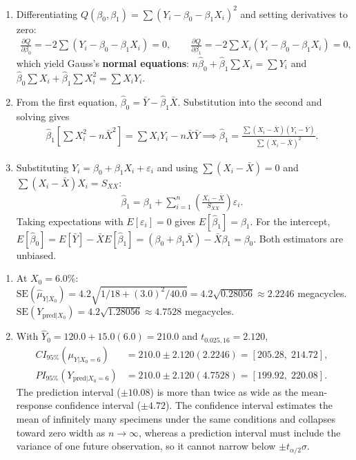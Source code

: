 \begin{solproblema}[prob:e97453b]
\begin{enumerate}
\item Differentiating $Q(\beta_0,\beta_1)=\sum(Y_i-\beta_0-\beta_1X_i)^2$ and setting derivatives to zero:
\begin{align}
\frac{\partial Q}{\partial\beta_0}=-2\sum(Y_i-\beta_0-\beta_1X_i)=0,\qquad \frac{\partial Q}{\partial\beta_1}=-2\sum X_i(Y_i-\beta_0-\beta_1X_i)=0,
\end{align}
which yield Gauss's \textbf{normal equations}: $n\hat\beta_0+\hat\beta_1\sum X_i=\sum Y_i$ and $\hat\beta_0\sum X_i+\hat\beta_1\sum X_i^2=\sum X_iY_i$.
\item From the first equation, $\hat\beta_0=\bar Y-\hat\beta_1\bar X$. Substitution into the second and solving gives
\begin{align}
\hat\beta_1\left[\sum X_i^2-n\bar X^2\right]=\sum X_iY_i-n\bar X\bar Y\implies\hat\beta_1=\frac{\sum(X_i-\bar X)(Y_i-\bar Y)}{\sum(X_i-\bar X)^2}.
\end{align}
\item Substituting $Y_i=\beta_0+\beta_1X_i+\varepsilon_i$ and using $\sum(X_i-\bar X)=0$ and $\sum(X_i-\bar X)X_i=S_{XX}$:
\begin{align}
\hat\beta_1=\beta_1+\sum_{i=1}^n\left(\frac{X_i-\bar X}{S_{XX}}\right)\varepsilon_i.
\end{align}
Taking expectations with $E[\varepsilon_i]=0$ gives $E[\hat\beta_1]=\beta_1$. For the intercept, $E[\hat\beta_0]=E[\bar Y]-\bar X E[\hat\beta_1]=(\beta_0+\beta_1\bar X)-\bar X\beta_1=\beta_0$. Both estimators are unbiased.
\end{enumerate}
\end{solproblema}

\begin{solproblema}[prob:5c55133]
\begin{enumerate}
\item At $X_0=6.0\%$: $\text{SE}(\hat\mu_{Y|X_0})=4.2\sqrt{1/18+(3.0)^2/40.0}=4.2\sqrt{0.28056}\approx2.2246$ megacycles. $\text{SE}(Y_{\text{pred}|X_0})=4.2\sqrt{1.28056}\approx4.7528$ megacycles.
\item With $\hat Y_0=120.0+15.0(6.0)=210.0$ and $t_{0.025,16}=2.120$,
\begin{align}
CI_{95\%}(\mu_{Y|X_0=6})&=210.0\pm2.120(2.2246)=[205.28,\;214.72],\\
PI_{95\%}(Y_{\text{pred}|X_0=6})&=210.0\pm2.120(4.7528)=[199.92,\;220.08].
\end{align}
The prediction interval ($\pm10.08$) is more than twice as wide as the mean-response confidence interval ($\pm4.72$). The confidence interval estimates the mean of infinitely many specimens under the same conditions and collapses toward zero width as $n\to\infty$, whereas a prediction interval must include the variance of one future observation, so it cannot narrow below $\pm t_{\alpha/2}\sigma$.
\end{enumerate}
\end{solproblema}

